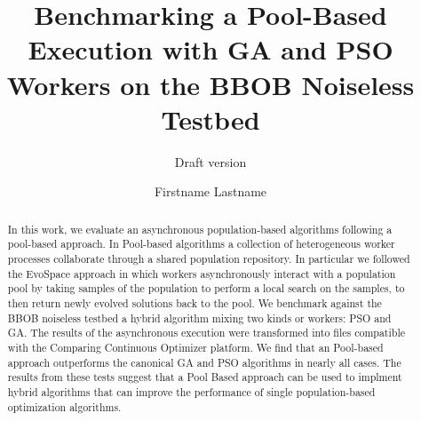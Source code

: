 \documentclass[sigconf]{acmart}
\begin{document}
\title{Benchmarking a Pool-Based Execution with GA and PSO Workers  
on the BBOB Noiseless Testbed}
\subtitle{Draft version}



\author{Firstname Lastname}
%
%
%
%
%
%
%

\renewcommand{\shortauthors}{Firstname Lastname et. al.}


\begin{abstract}
In this work, we  evaluate an asynchronous population-based 
algorithms following a pool-based approach. In Pool-based 
algorithms a collection of heterogeneous worker processes 
collaborate through a shared population repository. In particular
we followed the EvoSpace approach in which workers 
asynchronously interact with a population pool by taking 
samples of the population to perform a local search on the 
samples, to then return newly evolved solutions back to the 
pool. We benchmark  against the BBOB noiseless testbed a 
hybrid algorithm mixing two kinds or workers:  PSO  and GA. 
The results of the asynchronous execution were transformed 
into files compatible with the Comparing Continuous Optimizer 
platform. We find that an Pool-based approach outperforms
the canonical GA and PSO algorithms in nearly all cases. 
The results from these tests suggest that a Pool Based approach 
can be used to implment hybrid algorithms that can improve 
the performance of single population-based optimization algorithms.
\end{abstract}
\end{document}

